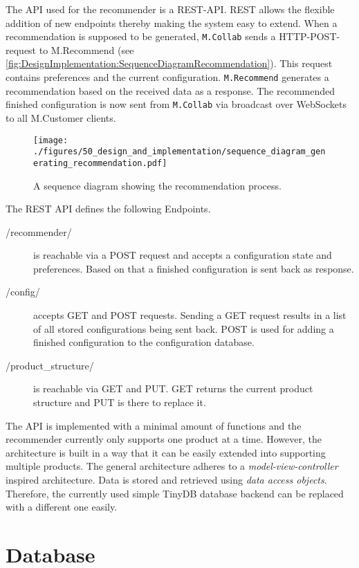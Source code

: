 The API used for the recommender is a REST-API. REST allows the flexible addition of new endpoints thereby making the system easy to extend.
When a recommendation is supposed to be generated, \texttt{M.Collab} sends a HTTP-POST-request to M.Recommend (see \autoref{fig:DesignImplementation:SequenceDiagramRecommendation}). This request contains preferences and the current configuration. \texttt{M.Recommend} generates a recommendation based on the received data as a response. The recommended finished configuration is now sent from  \texttt{M.Collab} via broadcast over WebSockets to all M.Customer clients. 

\begin{figure}
    \centering
    \texttt{[image: ./figures/50\_design\_and\_implementation/sequence\_diagram\_generating\_recommendation.pdf]}
    \caption[Sequence Diagram: Recommendation Generation]{A sequence diagram showing the recommendation process.}
    \label{fig:DesignImplementation:SequenceDiagramRecommendation}
\end{figure}

The REST API defines the following Endpoints.

\begin{description}
    \item[/recommender/] is reachable via a POST request and accepts a configuration state and preferences. Based on that a finished configuration is sent back as response.
    \item[/config/] accepts GET and POST requests. Sending a GET request results in a list of all stored configurations being sent back. POST is used for adding a finished configuration to the configuration database.
    \item[/product\_structure/] is reachable via GET and PUT. GET returns the current product structure and PUT is there to replace it.
\end{description}

The API is implemented with a minimal amount of functions and the recommender currently only supports one product at a time. However, the architecture is built in a way that it can be easily extended into supporting multiple products.
The general architecture adheres to a \emph{model-view-controller} \cite{gamma2015design} inspired architecture.
Data is stored and retrieved using \emph{data access objects}. Therefore, the currently used simple TinyDB database backend can be replaced with a different one easily.

\section{Database}
\label{sec:DesignImplementation:Database}

